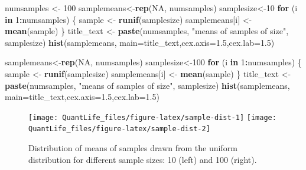 \documentclass[
]{book}
\newenvironment{Shaded}{\begin{snugshade}}{\end{snugshade}}
\newcommand{\ControlFlowTok}[1]{\textcolor[rgb]{0.13,0.29,0.53}{\textbf{#1}}}
\newcommand{\DataTypeTok}[1]{\textcolor[rgb]{0.13,0.29,0.53}{#1}}
\newcommand{\DecValTok}[1]{\textcolor[rgb]{0.00,0.00,0.81}{#1}}
\newcommand{\FloatTok}[1]{\textcolor[rgb]{0.00,0.00,0.81}{#1}}
\newcommand{\KeywordTok}[1]{\textcolor[rgb]{0.13,0.29,0.53}{\textbf{#1}}}
\newcommand{\NormalTok}[1]{#1}
\newcommand{\OperatorTok}[1]{\textcolor[rgb]{0.81,0.36,0.00}{\textbf{#1}}}
\newcommand{\OtherTok}[1]{\textcolor[rgb]{0.56,0.35,0.01}{#1}}
\newcommand{\StringTok}[1]{\textcolor[rgb]{0.31,0.60,0.02}{#1}}
\theoremstyle{definition}
\theoremstyle{definition}
\theoremstyle{definition}
\theoremstyle{remark}
\begin{document}
\begin{Shaded}
\begin{Highlighting}[]
\NormalTok{numsamples \textless{}{-}}\StringTok{ }\DecValTok{100}
\NormalTok{samplemeans\textless{}{-}}\KeywordTok{rep}\NormalTok{(}\OtherTok{NA}\NormalTok{, numsamples)}
\NormalTok{samplesize\textless{}{-}}\DecValTok{10}
\ControlFlowTok{for}\NormalTok{ (i }\ControlFlowTok{in} \DecValTok{1}\OperatorTok{:}\NormalTok{numsamples) \{}
\NormalTok{    sample \textless{}{-}}\StringTok{ }\KeywordTok{runif}\NormalTok{(samplesize)}
\NormalTok{    samplemeans[i] \textless{}{-}}\StringTok{ }\KeywordTok{mean}\NormalTok{(sample)}
\NormalTok{\}}
\NormalTok{title\_text \textless{}{-}}\StringTok{ }\KeywordTok{paste}\NormalTok{(numsamples, }\StringTok{"means of samples of size"}\NormalTok{, samplesize)}
\KeywordTok{hist}\NormalTok{(samplemeans, }\DataTypeTok{main=}\NormalTok{title\_text,}\DataTypeTok{cex.axis=}\FloatTok{1.5}\NormalTok{,}\DataTypeTok{cex.lab=}\FloatTok{1.5}\NormalTok{)}

\NormalTok{samplemeans\textless{}{-}}\KeywordTok{rep}\NormalTok{(}\OtherTok{NA}\NormalTok{, numsamples)}
\NormalTok{samplesize\textless{}{-}}\DecValTok{100}
\ControlFlowTok{for}\NormalTok{ (i }\ControlFlowTok{in} \DecValTok{1}\OperatorTok{:}\NormalTok{numsamples) \{}
\NormalTok{    sample \textless{}{-}}\StringTok{ }\KeywordTok{runif}\NormalTok{(samplesize)}
\NormalTok{    samplemeans[i] \textless{}{-}}\StringTok{ }\KeywordTok{mean}\NormalTok{(sample)}
\NormalTok{\}}
\NormalTok{title\_text \textless{}{-}}\StringTok{ }\KeywordTok{paste}\NormalTok{(numsamples, }\StringTok{"means of samples of size"}\NormalTok{, samplesize)}
\KeywordTok{hist}\NormalTok{(samplemeans, }\DataTypeTok{main=}\NormalTok{title\_text,}\DataTypeTok{cex.axis=}\FloatTok{1.5}\NormalTok{,}\DataTypeTok{cex.lab=}\FloatTok{1.5}\NormalTok{)}
\end{Highlighting}
\end{Shaded}

\begin{figure}

{\centering \texttt{[image: QuantLife\_files/figure-latex/sample-dist-1]} \texttt{[image: QuantLife\_files/figure-latex/sample-dist-2]} 

}

\caption{Distribution of means of samples drawn from the uniform distribution for different sample sizes: 10 (left) and 100 (right).}\label{fig:sample-dist}
\end{figure}
\end{document}
